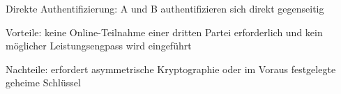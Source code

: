 \documentclass[a4paper]{article}
\makeatletter
\renewcommand{\subsection}{\@startsection{subsection}{2}{0mm}%
 {-1explus -.5ex minus -.2ex}%
 {0.5ex plus .2ex}%
 {\normalfont\normalsize\bfseries}}
\makeatother
\begin{document}
\begin{multicols}{3}
\begin{itemize*}
\begin{itemize*}
\begin{itemize*}
\begin{itemize*}
                        \end{itemize*}
                  \end{itemize*}
                  \item Direkte Authentifizierung: A und B authentifizieren sich direkt gegenseitig
                  \begin{itemize*}
                        \item Vorteile: keine Online-Teilnahme einer dritten Partei erforderlich und kein möglicher Leistungsengpass wird eingeführt
                        \item Nachteile: erfordert asymmetrische Kryptographie oder im Voraus festgelegte geheime Schlüssel
                  \end{itemize*}
            \end{itemize*}
      \end{itemize*}



\end{multicols}
\end{document}

